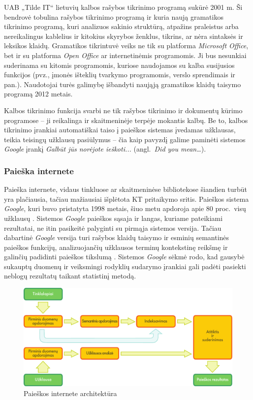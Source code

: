 \begin{multicols}{2}
    UAB „Tilde IT“  lietuvių kalbos rašybos tikrinimo programą sukūrė 2001 m. Ši bendrovė tobulina rašybos tikrinimo programą ir kuria naują gramatikos tikrinimo programą, kuri analizuos sakinio struktūrą, atpažins praleistus arba nereikalingus kablelius ir kitokius skyrybos ženklus, tikrins, ar nėra sintaksės ir leksikos klaidų. Gramatikos tikrintuvė veiks ne tik su platforma \textit{Microsoft Office}, bet ir su platforma \textit{Open Office} ar internetinėmis programomis. Ji bus nesunkiai suderinama su kitomis programomis, kuriose naudojamos su kalba susijusios funkcijos (pvz., įmonės išteklių tvarkymo programomis, verslo sprendimais ir pan.). Naudotojai turės galimybę išbandyti naująją gramatikos klaidų taisymo programą 2012 metais.   

    Kalbos tikrinimo funkcija svarbi ne tik rašybos tikrinimo ir dokumentų kūrimo programose – ji reikalinga ir skaitmeninėje terpėje mokantis kalbų. Be to, kalbos tikrinimo įrankiai automatiškai taiso į paieškos sistemas įvedamas užklausas, teikia teisingų užklausų pasiūlymus – čia kaip pavyzdį galime paminėti sistemos  \textit{Google} įrankį \textit{Galbūt jūs norėjote ieškoti...}  (angl.~\textit{Did you mean…}).

\subsubsection{Paieška internete }

 Paieška internete, vidaus tinkluose ar skaitmeninėse bibliotekose šiandien turbūt yra plačiausia, tačiau mažiausiai išplėtota KT pritaikymo sritis. Paieškos sistema \textit{Google}, kuri buvo pristatyta 1998 metais, šiuo metu apdoroja apie 80 proc.~visų užklausų \cite{spi1}.  Sistemos \textit{Google} paieškos sąsaja ir langas, kuriame pateikiami rezultatai, ne itin pasikeitė palyginti su pirmąja sistemos versija. Tačiau dabartinė \textit{Google} versija turi rašybos klaidų taisymo ir esminių semantinės paieškos funkcijų, analizuojančių užklausos terminų kontekstinę reikšmę ir galinčių padidinti paieškos tikslumą \cite{pc1}.  Sistemos \textit{Google} sėkmė rodo, kad gausybė sukauptų duomenų ir veiksmingi rodyklių sudarymo įrankiai gali padėti pasiekti neblogų rezultatų taikant statistinį metodą. 

\begin{figure}[htb]
  \center
  \includegraphics[width=\textwidth]{../_media/lithuanian/web_search_architecture}
  \caption{Paieškos internete architektūra}
  \label{fig:websearcharch_de}
\end{figure}


\end{multicols}
